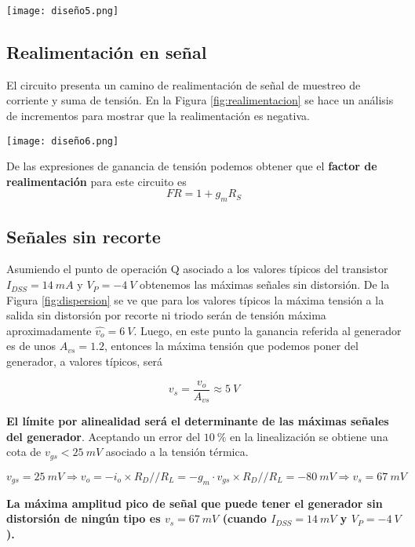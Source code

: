 \documentclass[a4paper, 10pt, spanish]{article}
\begin{document}
\begin{center}
           \texttt{[image: diseño5.png]}
           \label{fig:dispersion}
\end{center}


\subsection{Realimentación en señal}

El circuito presenta un camino de realimentación de señal de muestreo de corriente y suma de tensión. En la Figura \ref{fig:realimentacion} se hace un análisis de incrementos para mostrar que la realimentación es negativa.


\begin{center}
           \texttt{[image: diseño6.png]}
           \label{fig:realimentacion}
\end{center}


De las expresiones de ganancia de tensión podemos obtener que el \textbf{factor de realimentación} para este circuito es
\begin{equation}
	FR = 1+g_mR_S
	\end{equation}

\subsection{Señales sin recorte}

Asumiendo el punto de operación Q asociado a los valores típicos del transistor $I_{DSS} = 14\ mA$ y $V_P = -4\ V$ obtenemos las máximas señales sin distorsión. De la Figura \ref{fig:dispersion} se ve que para los valores típicos la máxima tensión a la salida sin distorsión por recorte ni triodo serán de tensión máxima aproximadamente $\hat{v_o} = 6\ V$. Luego, en este punto la ganancia referida al generador es de unos $A_{vs} = 1.2$, entonces la máxima tensión que podemos poner del generador, a valores típicos, será

\begin{equation}
	v_s = \frac{v_o}{A_{vs}} \approx 5\ V \nonumber
	\end{equation}

\textbf{El límite por alinealidad será el determinante de las máximas señales del generador}. Aceptando un error del $10\ \%$ en la linealización se obtiene una cota de $v_{gs} < 25\ mV$ asociado a la tensión térmica.

\begin{equation}
	v_{gs} = 25\ mV \Rightarrow v_o = -i_o\times R_D//R_L = -g_m\cdot v_{gs} \times R_D//R_L = - 80\ mV \Rightarrow v_s = 67\ mV
	\end{equation}

\textbf{La máxima amplitud pico de señal que puede tener el generador sin distorsión de ningún tipo es $v_s = 67\ mV$ (cuando $I_{DSS} = 14\ mV$ y $V_P = -4\ V$).}
\end{document}
